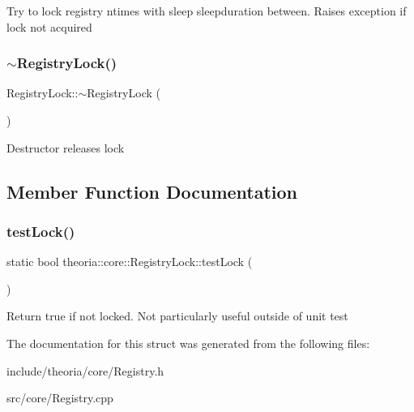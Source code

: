Try to lock registry ntimes with sleep sleepduration between. Raises exception if lock not acquired \mbox{\label{structtheoria_1_1core_1_1RegistryLock_a374ac63681fd8b4fa891897eeeb75465}} 
\subsubsection{\texorpdfstring{$\sim$\+Registry\+Lock()}{~RegistryLock()}}
{\footnotesize\ttfamily Registry\+Lock\+::$\sim$\+Registry\+Lock (\begin{DoxyParamCaption}{ }\end{DoxyParamCaption})}

Destructor releases lock 

\subsection{Member Function Documentation}
\mbox{\label{structtheoria_1_1core_1_1RegistryLock_a28e3a44cfa3ef223db18db201e635254}} 
\subsubsection{\texorpdfstring{test\+Lock()}{testLock()}}
{\footnotesize\ttfamily static bool theoria\+::core\+::\+Registry\+Lock\+::test\+Lock (\begin{DoxyParamCaption}{ }\end{DoxyParamCaption})\hspace{0.3cm}{\ttfamily [static]}}

Return true if not locked. Not particularly useful outside of unit test 

The documentation for this struct was generated from the following files\+:\begin{DoxyCompactItemize}
\item 
include/theoria/core/Registry.\+h\item 
src/core/Registry.\+cpp\end{DoxyCompactItemize}
